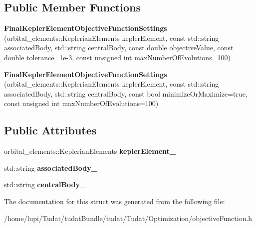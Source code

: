 \subsection*{Public Member Functions}
\begin{DoxyCompactItemize}
\item 
{\bfseries Final\+Kepler\+Element\+Objective\+Function\+Settings} (orbital\+\_\+elements\+::\+Keplerian\+Elements kepler\+Element, const std\+::string associated\+Body, std\+::string central\+Body, const double objective\+Value, const double tolerance=1e-\/3, const unsigned int max\+Number\+Of\+Evolutions=100)\hypertarget{structtudat_1_1optimization_1_1FinalKeplerElementObjectiveFunctionSettings_ae18dc5c3094fdb42fd970e4836aeab45}{}\label{structtudat_1_1optimization_1_1FinalKeplerElementObjectiveFunctionSettings_ae18dc5c3094fdb42fd970e4836aeab45}

\item 
{\bfseries Final\+Kepler\+Element\+Objective\+Function\+Settings} (orbital\+\_\+elements\+::\+Keplerian\+Elements kepler\+Element, const std\+::string associated\+Body, std\+::string central\+Body, const bool minimize\+Or\+Maximize=true, const unsigned int max\+Number\+Of\+Evolutions=100)\hypertarget{structtudat_1_1optimization_1_1FinalKeplerElementObjectiveFunctionSettings_a46aef1ea3b3649118fbeb0b851febb26}{}\label{structtudat_1_1optimization_1_1FinalKeplerElementObjectiveFunctionSettings_a46aef1ea3b3649118fbeb0b851febb26}

\end{DoxyCompactItemize}
\subsection*{Public Attributes}
\begin{DoxyCompactItemize}
\item 
orbital\+\_\+elements\+::\+Keplerian\+Elements {\bfseries kepler\+Element\+\_\+}\hypertarget{structtudat_1_1optimization_1_1FinalKeplerElementObjectiveFunctionSettings_abcb9875f81a06cd90b179800322bee02}{}\label{structtudat_1_1optimization_1_1FinalKeplerElementObjectiveFunctionSettings_abcb9875f81a06cd90b179800322bee02}

\item 
std\+::string {\bfseries associated\+Body\+\_\+}\hypertarget{structtudat_1_1optimization_1_1FinalKeplerElementObjectiveFunctionSettings_a5bcb5cb2372551989623911a5a07de86}{}\label{structtudat_1_1optimization_1_1FinalKeplerElementObjectiveFunctionSettings_a5bcb5cb2372551989623911a5a07de86}

\item 
std\+::string {\bfseries central\+Body\+\_\+}\hypertarget{structtudat_1_1optimization_1_1FinalKeplerElementObjectiveFunctionSettings_a6f7e6a15666440a0c2768eb4745291ce}{}\label{structtudat_1_1optimization_1_1FinalKeplerElementObjectiveFunctionSettings_a6f7e6a15666440a0c2768eb4745291ce}

\end{DoxyCompactItemize}


The documentation for this struct was generated from the following file\+:\begin{DoxyCompactItemize}
\item 
/home/lupi/\+Tudat/tudat\+Bundle/tudat/\+Tudat/\+Optimization/objective\+Function.\+h\end{DoxyCompactItemize}
